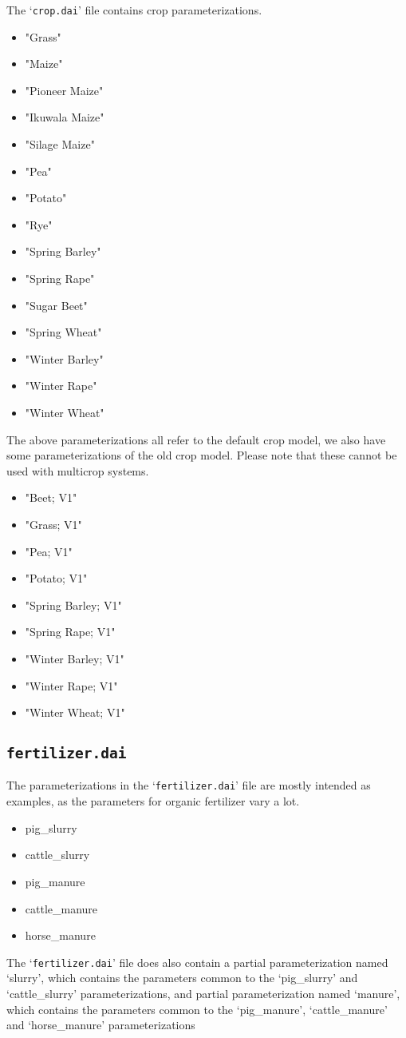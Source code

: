The `\texttt{crop.dai}' file contains crop parameterizations.

\begin{itemize}
\item "Grass"
\item "Maize"
\item "Pioneer Maize"
\item "Ikuwala Maize"
\item "Silage Maize"
\item "Pea"
\item "Potato"
\item "Rye"
\item "Spring Barley"
\item "Spring Rape"
\item "Sugar Beet"
\item "Spring Wheat"
\item "Winter Barley"
\item "Winter Rape"
\item "Winter Wheat"
\end{itemize}

The above parameterizations all refer to the default crop model, we
also have some parameterizations of the old crop model.  Please note
that these cannot be used with multicrop systems.

\begin{itemize}
\item "Beet; V1"
\item "Grass; V1"
\item "Pea; V1"
\item "Potato; V1"
\item "Spring Barley; V1"
\item "Spring Rape; V1"
\item "Winter Barley; V1"
\item "Winter Rape; V1"
\item "Winter Wheat; V1"
\end{itemize}

\subsection{\texttt{fertilizer.dai}}

The parameterizations in the `\texttt{fertilizer.dai}' file are mostly
intended as examples, as the parameters for organic fertilizer vary
a lot.  
\begin{itemize}
\item pig\_slurry
\item cattle\_slurry
\item pig\_manure
\item cattle\_manure
\item horse\_manure
\end{itemize}
The `\texttt{fertilizer.dai}' file does also contain a partial
parameterization named `slurry', which contains the parameters common
to the `pig\_slurry' and `cattle\_slurry' parameterizations, and
partial parameterization named `manure', which contains the parameters
common to the `pig\_manure', `cattle\_manure' and `horse\_manure'
parameterizations

